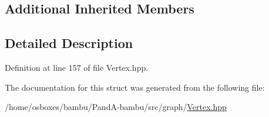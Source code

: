 \subsection*{Additional Inherited Members}


\subsection{Detailed Description}


Definition at line 157 of file Vertex.\+hpp.



The documentation for this struct was generated from the following file\+:\begin{DoxyCompactItemize}
\item 
/home/osboxes/bambu/\+Pand\+A-\/bambu/src/graph/\hyperlink{Vertex_8hpp}{Vertex.\+hpp}\end{DoxyCompactItemize}
